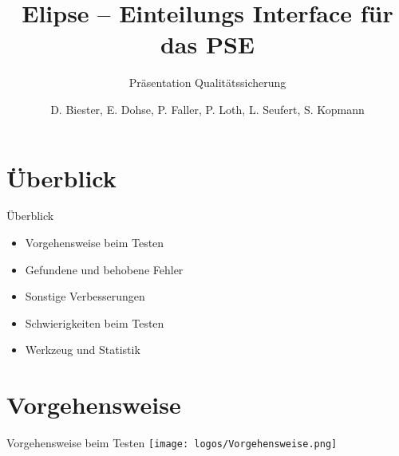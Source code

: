 \documentclass[18pt, xcolor=table]{beamer}
\title[Elipse]{Elipse -- Einteilungs Interface für das PSE}
\subtitle{Präsentation Qualitätssicherung}
\author{D. Biester, E. Dohse, P. Faller, P. Loth, L. Seufert, S. Kopmann}
\institute{IPD Snelting}
\begin{document}

\begin{frame}
\titlepage
\end{frame}
\section{Überblick}
\begin{frame}{Überblick}
\begin{itemize}
  \item Vorgehensweise beim Testen
  \item Gefundene und behobene Fehler
  \item Sonstige Verbesserungen
  \item Schwierigkeiten beim Testen
  \item Werkzeug und Statistik
\end{itemize}
\end{frame}

\section{Vorgehensweise}
\begin{frame}{Vorgehensweise beim Testen}
\texttt{[image: logos/Vorgehensweise.png]}
\end{frame}
\end{document}
